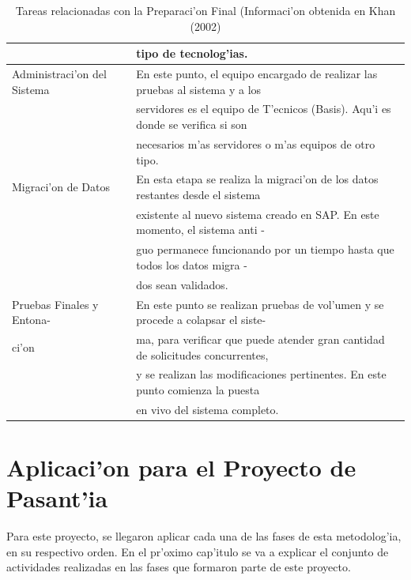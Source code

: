 \begin{table}[H]
\begin{tabular}{|l|l|}
                                              &  tipo de tecnolog'ias. \\
\hline
Administraci'on del Sistema    & En este punto, el equipo encargado de realizar las pruebas al sistema y a los \\ 
                                              & servidores es el equipo de T'ecnicos (Basis). Aqu'i es donde se verifica si son \\
                                              & necesarios m'as servidores o m'as equipos de otro tipo. \\
\hline
Migraci'on de Datos                & En esta etapa se realiza la migraci'on de los datos restantes desde el sistema \\
                                               & existente al nuevo sistema creado en SAP. En este momento, el sistema anti - \\
                                               & guo permanece funcionando por un tiempo hasta que todos los datos migra - \\
                                               & dos sean validados. \\
\hline 
Pruebas Finales y Entona-       & En este punto se realizan pruebas de vol'umen y se procede  a colapsar el siste- \\
ci'on                                       & ma, para verificar que puede atender gran cantidad de solicitudes concurrentes, \\
                                              & y se realizan las modificaciones pertinentes. En este punto comienza la puesta \\
                                              & en vivo del sistema completo. \\
\hline
\end{tabular}
\caption{Tareas relacionadas con la Preparaci'on Final (Informaci'on obtenida en Khan (2002)}
\label{tb:asignaciones}
\end{table}

\section{Aplicaci'on para el Proyecto  de Pasant'ia}
Para este proyecto, se llegaron aplicar cada una de las fases de esta metodolog'ia, en su respectivo orden. 	
\newline
\newline	 
\indent En el pr'oximo cap'itulo se va a explicar el conjunto de actividades realizadas en las fases que formaron parte de este proyecto.